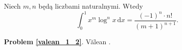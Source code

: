 %

\begin{problem_with_solution}
    \label{valean_1_2}%
    Niech $m, n$ będą liczbami naturalnymi.
    Wtedy
    \begin{equation}
        \int_0^1 x^m \log^n x \,\mathrm{d} x = \frac{(-1)^n \cdot n!}{(m+1)^{n+1}}.
    \end{equation}
\end{problem_with_solution}


\textbf{Problem \ref{valean_1_2}}.
Vălean \cite[s. 1, 2, ]{nahin15}.


%